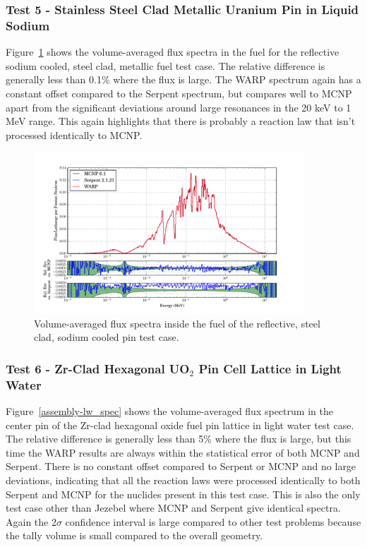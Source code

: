 \documentclass[preprint,12pt]{elsarticle}
\begin{document}
\newpage
\subsubsection{Test 5 - Stainless Steel Clad Metallic Uranium Pin in Liquid Sodium}

Figure~\ref{sodiumpin_spec} shows the volume-averaged flux spectra in the fuel for the reflective sodium cooled, steel clad, metallic fuel test case.  The relative difference is generally less than 0.1\% where the flux is large.  The WARP spectrum again has a constant offset compared to the Serpent spectrum, but compares well to MCNP apart from the significant deviations around large resonances in the 20 keV to 1 MeV range.  This again highlights that there is probably a reaction law that isn't processed identically to MCNP.

\begin{figure}[!htbp]
\centering
\includegraphics[width=0.9\textwidth,trim= 1cm 0cm 1cm 0cm]{graphics/sodiumpin_spec.pdf}
\caption{Volume-averaged flux spectra inside the fuel of the reflective, steel clad, sodium cooled pin test case. \label{sodiumpin_spec} }
\end{figure}


\newpage
\subsubsection{Test 6 - Zr-Clad Hexagonal UO$_2$ Pin Cell Lattice in Light Water}

Figure~\ref{assembly-lw_spec} shows the volume-averaged flux spectrum in the center pin of the Zr-clad hexagonal oxide fuel pin lattice in light water test case. The relative difference is generally less than 5\% where the flux is large, but this time the WARP results are always within the statistical error of both MCNP and Serpent.  There is no constant offset compared to Serpent or MCNP and no large deviations, indicating that all the reaction laws were processed identically to both Serpent and MCNP for the nuclides present in this test case.  This is also the only test case other than Jezebel where MCNP and Serpent give identical spectra.  Again the 2$\sigma$ confidence interval is large compared to other test problems because the tally volume is small compared to the overall geometry.
\end{document}
